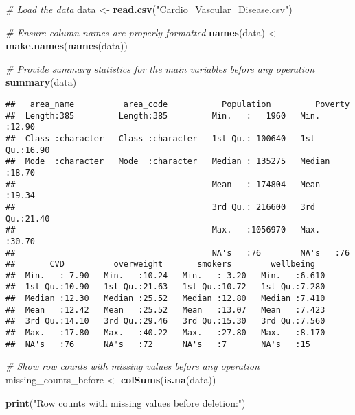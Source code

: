 \documentclass[
]{article}
\newenvironment{Shaded}{\begin{snugshade}}{\end{snugshade}}
\newcommand{\CommentTok}[1]{\textcolor[rgb]{0.56,0.35,0.01}{\textit{#1}}}
\newcommand{\FunctionTok}[1]{\textcolor[rgb]{0.13,0.29,0.53}{\textbf{#1}}}
\newcommand{\NormalTok}[1]{#1}
\newcommand{\OtherTok}[1]{\textcolor[rgb]{0.56,0.35,0.01}{#1}}
\newcommand{\StringTok}[1]{\textcolor[rgb]{0.31,0.60,0.02}{#1}}
\begin{document}
\begin{Shaded}
\begin{Highlighting}[]
\CommentTok{\# Load the data}
\NormalTok{data }\OtherTok{\textless{}{-}} \FunctionTok{read.csv}\NormalTok{(}\StringTok{"Cardio\_Vascular\_Disease.csv"}\NormalTok{)}

\CommentTok{\# Ensure column names are properly formatted}
\FunctionTok{names}\NormalTok{(data) }\OtherTok{\textless{}{-}} \FunctionTok{make.names}\NormalTok{(}\FunctionTok{names}\NormalTok{(data))}

\CommentTok{\# Provide summary statistics for the main variables before any operation}
\FunctionTok{summary}\NormalTok{(data)}
\end{Highlighting}
\end{Shaded}

\begin{verbatim}
##   area_name          area_code           Population         Poverty     
##  Length:385         Length:385         Min.   :   1960   Min.   :12.90  
##  Class :character   Class :character   1st Qu.: 100640   1st Qu.:16.90  
##  Mode  :character   Mode  :character   Median : 135275   Median :18.70  
##                                        Mean   : 174804   Mean   :19.34  
##                                        3rd Qu.: 216600   3rd Qu.:21.40  
##                                        Max.   :1056970   Max.   :30.70  
##                                        NA's   :76        NA's   :76     
##       CVD          overweight       smokers        wellbeing    
##  Min.   : 7.90   Min.   :10.24   Min.   : 3.20   Min.   :6.610  
##  1st Qu.:10.90   1st Qu.:21.63   1st Qu.:10.72   1st Qu.:7.280  
##  Median :12.30   Median :25.52   Median :12.80   Median :7.410  
##  Mean   :12.42   Mean   :25.52   Mean   :13.07   Mean   :7.423  
##  3rd Qu.:14.10   3rd Qu.:29.46   3rd Qu.:15.30   3rd Qu.:7.560  
##  Max.   :17.80   Max.   :40.22   Max.   :27.80   Max.   :8.170  
##  NA's   :76      NA's   :72      NA's   :7       NA's   :15
\end{verbatim}

\begin{Shaded}
\begin{Highlighting}[]
\CommentTok{\# Show row counts with missing values before any operation}
\NormalTok{missing\_counts\_before }\OtherTok{\textless{}{-}} \FunctionTok{colSums}\NormalTok{(}\FunctionTok{is.na}\NormalTok{(data))}

\FunctionTok{print}\NormalTok{(}\StringTok{"Row counts with missing values before deletion:"}\NormalTok{)}
\end{Highlighting}
\end{Shaded}
\end{document}
